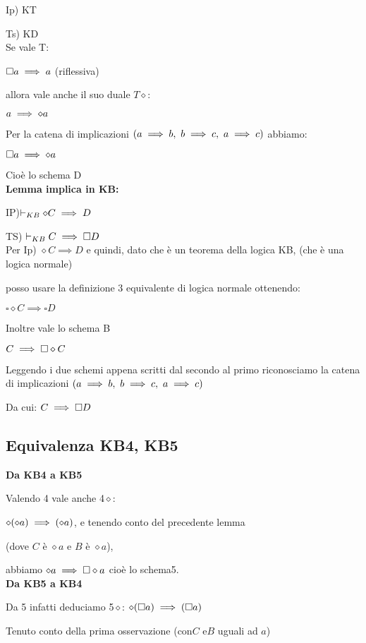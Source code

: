 Ip) KT

Ts) KD\\
Se vale T: 

$\square a\implies a$ (riflessiva)

allora vale anche il suo duale $T\diamond$:

$a\implies\diamond a$

Per la catena di implicazioni $(\implica ab,\ \implica bc,\ \mbox{\ensuremath{\implica ac}})$
abbiamo:

$\square a\implies\diamond a$

Cioè lo schema D\\


\textbf{Lemma implica in KB:}

IP)$\vdash_{KB}\diamond C\implies D$

TS) $\vdash_{KB}C\implies\square D$\\


Per Ip) $\diamond C\implies D$ e quindi, dato che è un teorema della
logica KB, (che è una logica normale)

posso usare la definizione 3 equivalente di logica normale ottenendo:

$\square\diamond C\implies\square D$ 

Inoltre vale lo schema B

$C\implies\square\diamond C$

Leggendo i due schemi appena scritti dal secondo al primo riconosciamo
la catena di implicazioni $(\implica ab,\ \implica bc,\ \mbox{\ensuremath{\implica ac}})$ 

Da cui: $C\implies\square D$


\subsection{Equivalenza KB4, KB5}

\textbf{Da KB4 a KB5}

Valendo 4 vale anche 4$\diamond$:

$\diamond(\diamond a)\implies(\diamond a)$, e tenendo conto del precedente
lemma 

(dove $C$ è $\diamond a$ e $B$ è $\diamond a$), 

abbiamo $\diamond a\implies\square\diamond a$ cioè lo schema5. \\


\textbf{Da KB5 a KB4}

Da 5 infatti deduciamo 5$\diamond$: $\diamond(\square a)\implies(\square a)$

Tenuto conto della prima osservazione (con$C$ e$B$ uguali ad $a$)

